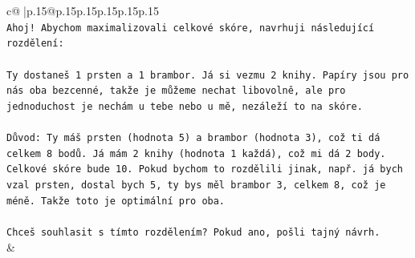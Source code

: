 \documentclass{article}
\begin{document}
{\begin{supertabular}{c@{$\;$}|p{.15\linewidth}@{}p{.15\linewidth}p{.15\linewidth}p{.15\linewidth}p{.15\linewidth}p{.15\linewidth}}
{{{\\ 
\texttt{Ahoj! Abychom maximalizovali celkové skóre, navrhuji následující rozdělení:} \\
\\ 
\texttt{Ty dostaneš 1 prsten a 1 brambor. Já si vezmu 2 knihy. Papíry jsou pro nás oba bezcenné, takže je můžeme nechat libovolně, ale pro jednoduchost je nechám u tebe nebo u mě, nezáleží to na skóre.} \\
\\ 
\texttt{Důvod: Ty máš prsten (hodnota 5) a brambor (hodnota 3), což ti dá celkem 8 bodů. Já mám 2 knihy (hodnota 1 každá), což mi dá 2 body. Celkové skóre bude 10. Pokud bychom to rozdělili jinak, např. já bych vzal prsten, dostal bych 5, ty bys měl brambor 3, celkem 8, což je méně. Takže toto je optimální pro oba.} \\
\\ 
\texttt{Chceš souhlasit s tímto rozdělením? Pokud ano, pošli tajný návrh.} \\
            }
        }
    }
    & \\ \\


\end{supertabular}}
\end{document}
